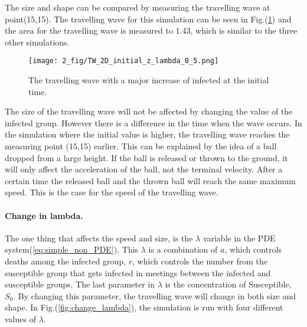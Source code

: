 \documentclass[%
twoside,                 %
final,                   %
chapterprefix=true,      %
open=right               %
10pt]{book}
\begin{document}
\vspace{3mm}




\vspace{3mm}


The size and shape can be compared by measuring the travelling wave at point(15,15). The travelling wave for this simulation can be seen in Fig.(\ref{fig:initial_trav_wave}) and the area for the travelling wave is measured to 1.43, which is similar to the three other simulations.


\begin{figure}[ht]
  \centerline{\texttt{[image: 2\_fig/TW\_2D\_initial\_z\_lambda\_0\_5.png]}}
  \caption{
  \label{fig:initial_trav_wave} The travelling wave with a major increase of infected at the initial time.
  }
\end{figure}




\vspace{3mm}




\vspace{3mm}


The size of the travelling  wave will not be affected by changing the value of the infected group. However there is a difference in the time when the wave occurs. In the simulation where the initial value is higher, the travelling wave reaches the measuring point (15,15) earlier. This can be explained by the idea of a ball dropped from a large height. If the ball is released or thrown to the ground, it will only affect the acceleration of the ball, not the terminal velocity. After a certain time the released ball and the thrown ball will reach the same maximum speed. This is the case for the speed of the travelling wave. 
\paragraph{Change in lambda.}
The one thing that affects the speed and size, is the $\lambda$ variable in the PDE system(\ref{eq:simple_non_PDE}). This $\lambda$ is a combination of $a$, which controls deaths among the infected group, $r$, which controls the number from the susceptible group that gets infected in meetings between the infected and susceptible groups. The last parameter in $\lambda$ is the concentration of Susceptible, $S_0$. By changing this parameter, the travelling wave will change in both size and shape. In Fig.(\ref{fig:change_lambda}), the simulation is run with four different values of $\lambda$.
\end{document}

